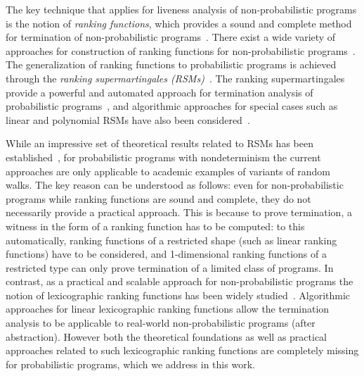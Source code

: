 \smallskip{}
The key technique that applies for liveness analysis of non-probabilistic programs is 
the notion of {\em ranking functions}, which provides a sound and complete 
method for termination of non-probabilistic programs~\cite{rwfloyd1967programs}.
There exist a wide variety of approaches for construction 
of ranking functions for non-probabilistic programs~\cite{DBLP:conf/cav/BradleyMS05,DBLP:conf/tacas/ColonS01,DBLP:conf/vmcai/PodelskiR04,DBLP:conf/pods/SohnG91}.
The generalization of ranking functions to probabilistic programs is achieved through the
{\em ranking supermartingales (RSMs)}~\cite{}.
The ranking supermartingales provide a powerful and automated approach for termination 
analysis of probabilistic programs~\cite{SriramCAV,HolgerPOPL,HONGFEI}, and 
algorithmic 
approaches for special cases such as linear and polynomial RSMs have
also been considered~\cite{POPL,CAV,POPL}.



\smallskip{} 
While an impressive set of theoretical results related to RSMs has been
established~\cite{}, for probabilistic programs with nondeterminism the current approaches  
are only applicable to academic examples of variants of random walks. 
The key reason can be understood as follows: even for non-probabilistic programs while 
ranking functions are sound and complete, they do not necessarily provide a practical 
approach. This is because to prove termination, a witness in the form of a 
ranking function has to be computed: to this automatically, ranking functions 
of a restricted shape (such as linear ranking functions) have to be considered, 
and 1-dimensional ranking functions of a restricted type can only prove 
termination of a limited class of programs. 
In contrast, as a practical and scalable approach for non-probabilistic programs the 
notion of lexicographic ranking functions has been widely 
studied~\cite{}. 
Algorithmic approaches for linear lexicographic ranking functions allow the 
termination analysis 
to be applicable to real-world non-probabilistic programs (after abstraction).
However both the theoretical foundations as well as practical approaches related to 
such lexicographic ranking functions are completely missing for probabilistic programs,
which we address in this work.







